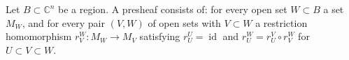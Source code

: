 Let $B \subset \mathbb{C}^n$ be a region. A presheaf consists of: for every open set $W \subset B$ a set $M_W$, and for every pair $(V, W)$ of open sets with $V \subset W$ a restriction homomorphism $r^W_V: M_W \to M_V$ satisfying $r^U_U = \operatorname{id}$ and $r^W_U = r^V_U \circ r^W_V$ for $U \subset V \subset W$.
